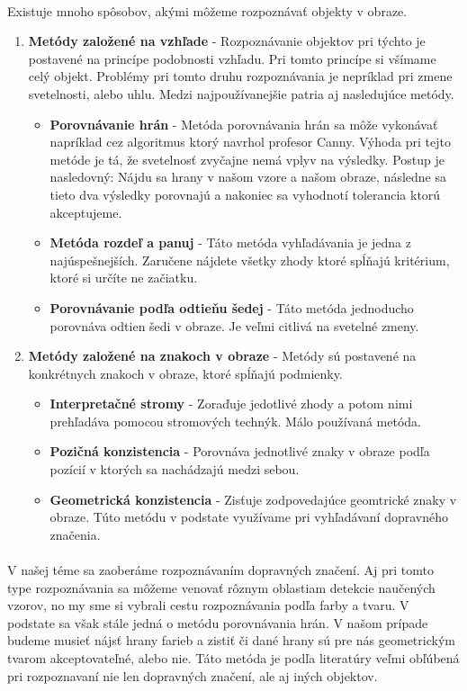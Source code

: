 \documentclass[12pt]{article}
\begin{document}
\paragraph{}
Existuje mnoho spôsobov, akými môžeme rozpoznávať objekty v obraze.
\begin{enumerate}
  \item \textbf{Metódy založené na vzhľade} - Rozpoznávanie objektov pri týchto je postavené na princípe podobnosti vzhľadu.
  Pri tomto princípe si všímame celý objekt. Problémy pri tomto druhu rozpoznávania je nepríklad pri zmene svetelnosti, alebo uhlu. Medzi najpoužívanejšie patria aj nasledujúce metódy.
	\cite{computer_vission_aaa}
	\begin{itemize}
	  \item \textbf{Porovnávanie hrán} - Metóda porovnávania hrán sa môže vykonávať napríklad cez algoritmus ktorý navrhol profesor Canny.
	  Výhoda pri tejto metóde je tá, že svetelnosť zvyčajne nemá vplyv na výsledky. Postup je nasledovný: 
	  Nájdu sa hrany v našom vzore a našom obraze, následne sa tieto dva výsledky porovnajú a nakoniec sa vyhodnotí tolerancia ktorú akceptujeme.
	  \item \textbf{Metóda rozdeľ a panuj} - Táto metóda vyhľadávania je jedna z najúspešnejších. Zaručene nájdete všetky zhody ktoré spĺňajú kritérium, ktoré si určíte ne začiatku.
	  \item \textbf{Porovnávanie podľa odtieňu šedej} - Táto metóda jednoducho porovnáva odtien šedi v obraze. Je veľmi citlivá na svetelné zmeny.
	\end{itemize}
  \item \textbf{Metódy založené na znakoch v obraze} - Metódy sú postavené na konkrétnych znakoch v obraze, ktoré spĺňajú podmienky.
  	\begin{itemize}
  	  \item \textbf{Interpretačné stromy} - Zoraďuje jedotlivé zhody a potom nimi prehľadáva pomocou stromových technýk. Málo používaná metóda.
  	  \item \textbf{Pozičná konzistencia} - Porovnáva jednotlivé znaky v obraze podľa pozícií v ktorých sa nachádzajú medzi sebou.
  	  \item \textbf{Geometrická konzistencia} - Zisťuje zodpovedajúce geomtrické znaky v obraze. Túto metódu v podstate využívame pri vyhľadávaní dopravného značenia.
  	\end{itemize}
\end{enumerate}
\paragraph{}
V našej téme sa zaoberáme rozpoznávaním dopravných značení. Aj pri tomto type rozpoznávania sa môžeme venovať rôznym oblastiam detekcie naučených vzorov, no my sme si vybrali cestu rozpoznávania podľa farby a tvaru.
V podstate sa však stále jedná o metódu porovnávania hrán. V našom prípade budeme musieť nájsť hrany farieb a zistiť či dané hrany sú pre nás geometrickým tvarom akceptovateľné, alebo nie.
Táto metóda je podľa literatúry veľmi obľúbená pri rozpoznavaní nie len dopravných značení, ale aj iných objektov.
\cite{computer_vission_aaa}
\end{document}
